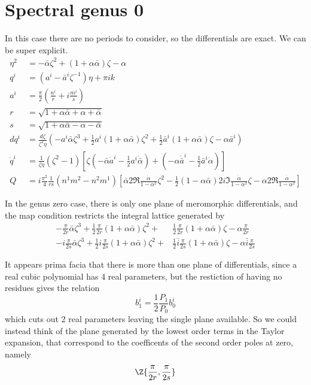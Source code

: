 \documentclass{article}
\begin{document}
\chapter{Spectral genus 0} %
\label{chp:spectral_genus_0}
In this case there are no periods to consider, so the differentials are exact. We can be super explicit.
\begin{align*}
\eta^2 &= -\bar\alpha \zeta^2 + (1+\alpha\bar\alpha)\zeta - \alpha \\
q^i &= (a^i - \bar a^i \zeta^{-1})\eta + \pi i k \\
a^i &= \frac{\pi}{2}\left( \frac{n^i}{r} + i \frac{m^i}{s} \right) \\
r &= \sqrt{1 + \alpha\bar\alpha + \alpha + \bar\alpha} \\
s &= \sqrt{1 + \alpha\bar\alpha - \alpha - \bar\alpha} \\
dq^i &= \frac{d\zeta}{\zeta^2\eta} \left( -a^i\bar\alpha\zeta^3 + \frac{1}{2}a^i(1+\alpha\bar\alpha)\zeta^2 + \frac{1}{2}\bar a^i(1+\alpha\bar\alpha)\zeta  - \alpha\bar a^i\right) \\
\dot q^i &= \frac{1}{\zeta\eta}(\zeta^2-1)\left[ \zeta(-\bar\alpha\dot a^i - \frac{1}{2} a^i \dot{\bar\alpha}) + (-\alpha\dot {\bar a}^i - \frac{1}{2} \bar a^i \dot\alpha) \right]\\
Q &= i \frac{\pi^2}{4}\frac{1}{rs}(n^1m^2-n^2m^1) \left[ \bar\alpha 2\Re \frac{\dot\alpha}{1-\alpha^2}\zeta^2 - \frac{1}{2}(1-\alpha\bar\alpha)2i\Im \frac{\dot\alpha}{1-\alpha^2} \zeta - \alpha 2\Re \frac{\dot\alpha}{1-\alpha^2}\right]
\end{align*}

In the genus zero case, there is only one plane of meromorphic differentials, and the map condition restricts the integral lattice generated by
\begin{align*}
-\frac{\pi}{2r}\bar\alpha\zeta^3 + \frac{1}{2}\frac{\pi}{2r}(1+\alpha\bar\alpha)\zeta^2 +& \frac{1}{2}\frac{\pi}{2r}(1+\alpha\bar\alpha)\zeta  - \alpha\frac{\pi}{2r} \\
-i\frac{\pi}{2s}\bar\alpha\zeta^3 + \frac{1}{2}i\frac{\pi}{2s}(1+\alpha\bar\alpha)\zeta^2 +& \frac{1}{2}\bar i\frac{\pi}{2s}(1+\alpha\bar\alpha)\zeta  - \alpha\bar i\frac{\pi}{2s}
\end{align*}

It appears prima facia that there is more than one plane of differentials, since a real cubic polynomial has 4 real parameters, but the restiction of having no residues gives the relation
\[
b^i_1 = \frac{1}{2}\frac{P_1}{P_0}b^i_0
\]
which cuts out 2 real parameters leaving the single plane available. So we could instead think of the plane generated by the lowest order terms in the Taylor expansion, that correspond to the coefficents of the second order poles at zero, namely
\[
\Z\{\frac{\pi}{2r}, \frac{\pi}{2s}\}
\]
\end{document}
